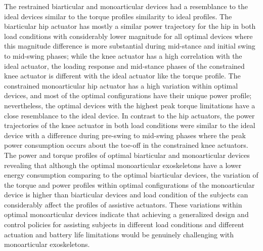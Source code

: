 \documentclass[10pt,letterpaper]{article}
\begin{document}
The restrained biarticular and monoarticular devices had a resemblance to the ideal devices similar to the torque profiles similarity to ideal profiles. The biarticular hip actuator has mostly a similar power trajectory for the hip in both load conditions with considerably lower magnitude for all optimal devices where this magnitude difference is more substantial during mid-stance and initial swing to mid-swing phases; while the knee actuator has a high correlation with the ideal actuator, the loading response and mid-stance phases of the constrained knee actuator is different with the ideal actuator like the torque profile. The constrained monoarticular hip actuator has a high variation within optimal devices, and most of the optimal configurations have their unique power profile; nevertheless, the optimal devices with the highest peak torque limitations have a close resemblance to the ideal device. In contrast to the hip actuators, the power trajectories of the knee actuator in both load conditions were similar to the ideal device with a difference during pre-swing to mid-swing phases where the peak power consumption occurs about the toe-off in the constrained knee actuators.\\
The power and torque profiles of optimal biarticular and monoarticular devices revealing that although the optimal monoarticular exoskeletons have a lower energy consumption comparing to the optimal biarticular devices, the variation of the torque and power profiles within optimal configurations of the monoarticular device is higher than biarticular devices and load condition of the subjects can considerably affect the profiles of assistive actuators. These variations within optimal monoarticular devices indicate that achieving a generalized design and control policies for assisting subjects in different load conditions and different actuation and battery life limitations would be genuinely challenging with monoarticular exoskeletons.
\end{document}
